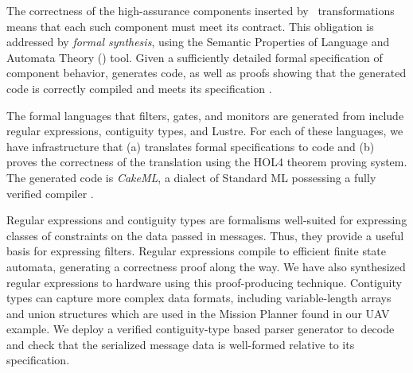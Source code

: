 The correctness of the high-assurance components inserted
by \briefcase \ transformations means that each such component
must meet its \agree{} contract. This obligation is addressed by
\emph{formal synthesis}, using the Semantic Properties of Language
and Automata Theory (\splat) tool.  Given a sufficiently detailed formal
specification of component behavior, \splat{} generates code,
as well as proofs showing that the generated code is
correctly compiled and meets its specification \cite{case-models-2021}.

The formal languages that filters, gates, and monitors are generated
from include regular expressions, contiguity types, and Lustre.
For each of these languages, we have infrastructure
that (a) translates formal specifications to code and (b) proves the
correctness of the translation using the HOL4 theorem proving system.
The generated code is \emph{CakeML}, a dialect of Standard ML
possessing a fully verified compiler \cite{cakeml}.


Regular expressions and contiguity types are formalisms well-suited
for expressing classes of constraints on the data passed in
messages. Thus, they provide a useful basis for expressing
filters. Regular expressions compile to efficient finite state
automata, generating a correctness proof along the way.
We have also synthesized regular
expressions to hardware using this proof-producing
technique.
Contiguity types can capture more complex
data formats, including variable-length arrays and union structures
which are used in the Mission Planner found in our UAV example.
We deploy a verified contiguity-type based parser generator
to decode and check that the serialized message data is well-formed
relative to its specification.

